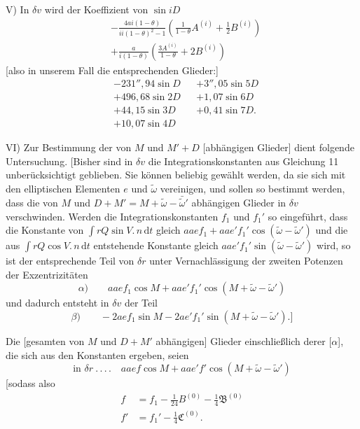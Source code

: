 V) In \(\delta v\) wird der Koeffizient von \(\sin iD\)
\[
\begin{aligned}
&-\frac{4ai(1-\theta)}{ii(1-\theta)^2-1}\left(\frac1{1-\theta}A^{(i)}+\tfrac12B^{(i)}\right)\\
&+\frac a{i(1-\theta)}\left(\frac{3A^{(i)}}{1-\theta}+2B^{(i)}\right)
\end{aligned}
\]
[also in unserem Fall die entsprechenden Glieder:]
\[
\begin{aligned}
&-231''{,}94\sin D&&+3''{,}05\sin5D\\
&+496{,}68\sin2D&&+1{,}07\sin6D\\
&+44{,}15\sin3D&&+0{,}41\sin7D.\\
&+10{,}07\sin4D
\end{aligned}
\]

VI) Zur Bestimmung der von \(M\) und \(M'+D\) [abhängigen Glieder] dient folgende Untersuchung. [Bisher sind in \(\delta v\) die Integrationskonstanten aus Gleichung 11 unberücksichtigt geblieben. Sie können beliebig gewählt werden, da sie sich mit den elliptischen Elementen \(e\) und \(\tilde\omega\) vereinigen, und sollen so bestimmt werden, dass die von \(M\) und \(D+M'=M+\tilde\omega-\bar{\tilde\omega}'\) abhängigen Glieder in \(\delta v\) verschwinden. Werden die Integrationskonstanten \(f_1\) und \(f_1'\) so eingeführt, dass die Konstante von \(\int rQ\sin V\mathord{.}\,n\,\mathrm{d}t\) gleich \(aaef_1+aae'f_1'\cos(\tilde\omega-\tilde\omega')\) und die aus \(\int rQ\cos V\mathord{.}\,n\,\mathrm{d}t\) entstehende Konstante gleich \(aae'f_1'\sin(\tilde\omega-\tilde\omega')\) wird, so ist der entsprechende Teil von \(\delta r\) unter Vernachlässigung der zweiten Potenzen der Exzentrizitäten
\[
\alpha)\qquad aaef_1\cos M+aae'f_1'\cos(M+\tilde\omega-\tilde\omega')
\]
und dadurch entsteht in \(\delta v\) der Teil
\[
\beta)\qquad-2aef_1\sin M-2ae'f_1'\sin(M+\tilde\omega-\tilde\omega').]
\]

Die [gesamten von \(M\) und \(D+M'\) abhängigen] Glieder einschließlich derer [\(\alpha\)], die sich aus den Konstanten ergeben, seien
\hypertarget{native-399}{}
\[
\text{in }\delta r\ .\, .\, .\, .\quad aaef\cos M+aae'f'\cos(M+\tilde\omega-\tilde\omega')
\]
[sodass also
\[
\begin{aligned}
f&=f_1-\tfrac1{24}B^{(0)}-\tfrac14\mathfrak B^{(0)}\\
f'&=f_1'-\tfrac14\mathfrak C^{(0)}.
\end{aligned}
\]


